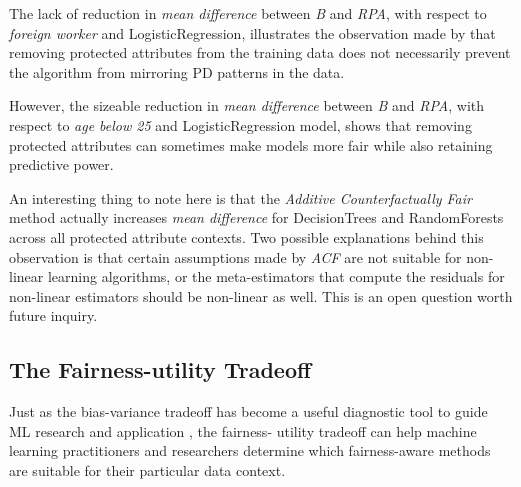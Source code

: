 \documentclass{acm_proc_article-sp}
\begin{document}
The lack of reduction in \emph{mean difference} between \emph{B} and \emph{RPA},
with respect to \emph{foreign worker} and LogisticRegression, illustrates the
observation made by \cite{kusner2017counterfactual} that removing protected
attributes from the training data does not necessarily prevent the algorithm
from mirroring PD patterns in the data.

However, the sizeable reduction in \emph{mean difference} between \emph{B} and
\emph{RPA}, with respect to \emph{age below 25} and LogisticRegression model,
shows that removing protected attributes can sometimes make models more fair
while also retaining predictive power.

An interesting thing to note here is that the \emph{Additive Counterfactually
Fair} method actually increases \emph{mean difference} for DecisionTrees and
RandomForests across all protected attribute contexts. Two possible explanations
behind this observation is that certain assumptions made by \emph{ACF} are not
suitable for non-linear learning algorithms, or the meta-estimators that compute
the residuals for non-linear estimators should be non-linear as well. This
is an open question worth future inquiry.

\subsection{The Fairness-utility Tradeoff}

Just as the bias-variance tradeoff has become a useful diagnostic tool to guide
ML research and application \cite{fortmann2012understanding}, the fairness-
utility tradeoff can help machine learning practitioners and researchers
determine which fairness-aware methods are suitable for their particular data
context.
\end{document}
